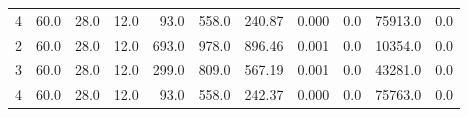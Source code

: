 \begin{tabular}{lrrrrrrrrrr}
4 &                60.0 &                28.0 &                 12.0 &          93.0 &           558.0 &           240.87 &                                         0.000 &                      0.0 &                     75913.0 &                           0.0 \\
2 &                60.0 &                28.0 &                 12.0 &         693.0 &           978.0 &           896.46 &                                         0.001 &                      0.0 &                     10354.0 &                           0.0 \\
3 &                60.0 &                28.0 &                 12.0 &         299.0 &           809.0 &           567.19 &                                         0.001 &                      0.0 &                     43281.0 &                           0.0 \\
4 &                60.0 &                28.0 &                 12.0 &          93.0 &           558.0 &           242.37 &                                         0.000 &                      0.0 &                     75763.0 &                           0.0 \\
\bottomrule
\end{tabular}
